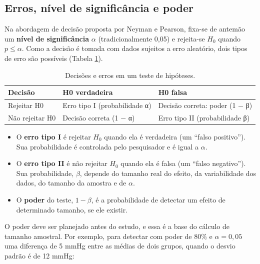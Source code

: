 \documentclass[
]{book}
\providecommand{\tightlist}{%
  \setlength{\itemsep}{0pt}\setlength{\parskip}{0pt}}
\begin{document}
\subsection{Erros, nível de significância e poder}\label{erros-nuxedvel-de-significuxe2ncia-e-poder}

Na abordagem de decisão proposta por Neyman e Pearson, fixa-se de antemão um \textbf{nível de significância} \(\alpha\) (tradicionalmente 0,05) e rejeita-se \(H_0\) quando \(p \le \alpha\). Como a decisão é tomada com dados sujeitos a erro aleatório, dois tipos de erro são possíveis (Tabela \ref{tab:inf-erros}).

\begin{table}

\caption{\label{tab:inf-erros}Decisões e erros em um teste de hipóteses.}
\centering
\begin{tabular}[t]{>{\raggedright\arraybackslash}p{2.6cm}|>{\raggedright\arraybackslash}p{3.8cm}|>{\raggedright\arraybackslash}p{3.8cm}}
\hline
Decisão & H0 verdadeira & H0 falsa\\
\hline
Rejeitar H0 & Erro tipo I (probabilidade α) & Decisão correta: poder (1 − β)\\
\hline
Não rejeitar H0 & Decisão correta (1 − α) & Erro tipo II (probabilidade β)\\
\hline
\end{tabular}
\end{table}

\begin{itemize}
\tightlist
\item
  O \textbf{erro tipo I} é rejeitar \(H_0\) quando ela é verdadeira (um ``falso positivo''). Sua probabilidade é controlada pelo pesquisador e é igual a \(\alpha\).
\item
  O \textbf{erro tipo II} é não rejeitar \(H_0\) quando ela é falsa (um ``falso negativo''). Sua probabilidade, \(\beta\), depende do tamanho real do efeito, da variabilidade dos dados, do tamanho da amostra e de \(\alpha\).
\item
  O \textbf{poder} do teste, \(1 - \beta\), é a probabilidade de detectar um efeito de determinado tamanho, se ele existir.
\end{itemize}

O poder deve ser planejado antes do estudo, e essa é a base do cálculo de tamanho amostral. Por exemplo, para detectar com poder de 80\% e \(\alpha = 0{,}05\) uma diferença de 5 mmHg entre as médias de dois grupos, quando o desvio padrão é de 12 mmHg:
\end{document}
